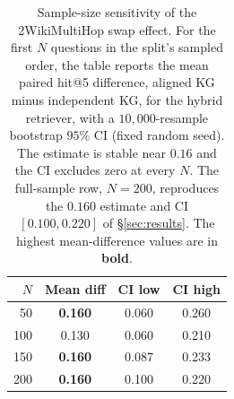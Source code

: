 \documentclass[11pt]{article}
\newcommand{\best}[1]{\textbf{#1}}          %
\begin{document}
\begin{table}[ht]\centering\footnotesize
\setlength{\tabcolsep}{3pt}
\caption{Zero-edge control on 2WikiMultiHop: the aligned KG with every edge deleted and its nodes and gold passage links kept. The hybrid retriever keeps a significant advantage over the OpenIE KG (sign test $p=2.4\times10^{-5}$ and $0.024$). PPR, which can reach the second gold passage only through an edge, collapses; the hybrid-PPR retriever returns to the OpenIE level ($p=1.0$ on both splits).}
\label{tab:zeroedge}
\end{table}


\begin{table}[ht]\centering\small
\begin{tabular}{rccc}
\toprule
$N$ & Mean diff & CI low & CI high\\
\midrule
50 & \best{0.160} & 0.060 & 0.260\\
100 & 0.130 & 0.060 & 0.210\\
150 & \best{0.160} & 0.087 & 0.233\\
200 & \best{0.160} & 0.100 & 0.220\\
\bottomrule
\end{tabular}
\caption{Sample-size sensitivity of the 2WikiMultiHop swap effect. For the first $N$ questions in the split's sampled order, the table reports the mean paired hit@5 difference, aligned KG minus independent KG, for the hybrid retriever, with a $10{,}000$-resample bootstrap $95\%$ CI (fixed random seed). The estimate is stable near $0.16$ and the CI excludes zero at every $N$. The full-sample row, $N{=}200$, reproduces the $0.160$ estimate and CI $[0.100,0.220]$ of \S\ref{sec:results}. The highest mean-difference values are in \best{bold}.}
\label{tab:samplesize}
\end{table}
\end{document}
